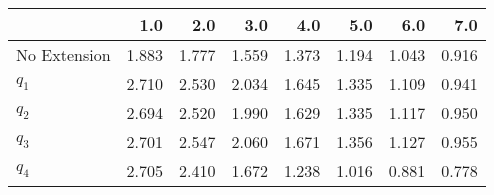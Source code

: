 \begin{tabular}{lrrrrrrr}
\toprule
{} &   1.0 &   2.0 &   3.0 &   4.0 &   5.0 &   6.0 &   7.0 \\
\midrule
No Extension & 1.883 & 1.777 & 1.559 & 1.373 & 1.194 & 1.043 & 0.916 \\
$q_1$        & 2.710 & 2.530 & 2.034 & 1.645 & 1.335 & 1.109 & 0.941 \\
$q_2$        & 2.694 & 2.520 & 1.990 & 1.629 & 1.335 & 1.117 & 0.950 \\
$q_3$        & 2.701 & 2.547 & 2.060 & 1.671 & 1.356 & 1.127 & 0.955 \\
$q_4$        & 2.705 & 2.410 & 1.672 & 1.238 & 1.016 & 0.881 & 0.778 \\
\bottomrule
\end{tabular}
